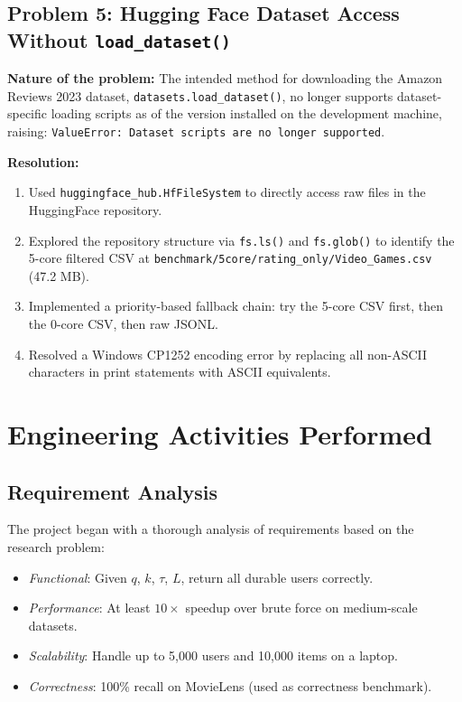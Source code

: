 \subsection{Problem 5: Hugging Face Dataset Access Without \texttt{load\_dataset()}}

\textbf{Nature of the problem:} The intended method for downloading the Amazon Reviews 2023 dataset, \texttt{datasets.load\_dataset()}, no longer supports dataset-specific loading scripts as of the version installed on the development machine, raising: \texttt{ValueError: Dataset scripts are no longer supported}.

\textbf{Resolution:}
\begin{enumerate}
  \item Used \texttt{huggingface\_hub.HfFileSystem} to directly access raw files in the HuggingFace repository.
  \item Explored the repository structure via \texttt{fs.ls()} and \texttt{fs.glob()} to identify the 5-core filtered CSV at \texttt{benchmark/5core/rating\_only/Video\_Games.csv} (47.2 MB).
  \item Implemented a priority-based fallback chain: try the 5-core CSV first, then the 0-core CSV, then raw JSONL.
  \item Resolved a Windows CP1252 encoding error by replacing all non-ASCII characters in print statements with ASCII equivalents.
\end{enumerate}

\section{Engineering Activities Performed}

\subsection{Requirement Analysis}

The project began with a thorough analysis of requirements based on the research problem:
\begin{itemize}
  \item \textit{Functional}: Given $q$, $k$, $\tau$, $L$, return all durable users correctly.
  \item \textit{Performance}: At least $10\times$ speedup over brute force on medium-scale datasets.
  \item \textit{Scalability}: Handle up to 5{,}000 users and 10{,}000 items on a laptop.
  \item \textit{Correctness}: 100\% recall on MovieLens (used as correctness benchmark).
\end{itemize}

